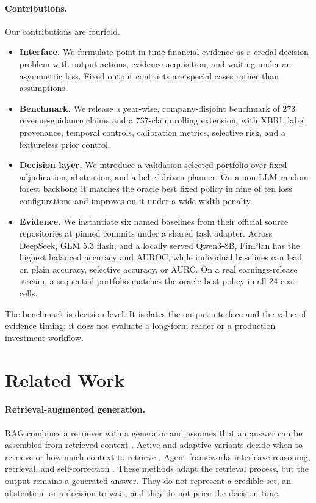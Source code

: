 \documentclass[11pt]{article}
\newcommand{\method}{FinPlan}
\begin{document}
\paragraph{Contributions.}
Our contributions are fourfold.
\begin{itemize}[leftmargin=*,itemsep=1pt,topsep=2pt]
\item \textbf{Interface.} We formulate point-in-time financial evidence as a credal decision problem with output actions, evidence acquisition, and waiting under an asymmetric loss. Fixed output contracts are special cases rather than assumptions.
\item \textbf{Benchmark.} We release a year-wise, company-disjoint benchmark of 273 revenue-guidance claims and a 737-claim rolling extension, with XBRL label provenance, temporal controls, calibration metrics, selective risk, and a featureless prior control.
\item \textbf{Decision layer.} We introduce a validation-selected portfolio over fixed adjudication, abstention, and a belief-driven planner. On a non-LLM random-forest backbone it matches the oracle best fixed policy in nine of ten loss configurations and improves on it under a wide-width penalty.
\item \textbf{Evidence.} We instantiate six named baselines from their official source repositories at pinned commits under a shared task adapter. Across DeepSeek, GLM 5.3 flash, and a locally served Qwen3-8B, \method{} has the highest balanced accuracy and AUROC, while individual baselines can lead on plain accuracy, selective accuracy, or AURC. On a real earnings-release stream, a sequential portfolio matches the oracle best policy in all 24 cost cells.
\end{itemize}

The benchmark is decision-level. It isolates the output interface and the value of evidence timing; it does not evaluate a long-form reader or a production investment workflow.

\section{Related Work}

\paragraph{Retrieval-augmented generation.}
RAG combines a retriever with a generator and assumes that an answer can be assembled from retrieved context \citep{lewis2020rag}. Active and adaptive variants decide when to retrieve or how much context to retrieve \citep{jiang2023flare,jeong2024adaptiverag}. Agent frameworks interleave reasoning, retrieval, and self-correction \citep{yao2023react,shinn2023reflexion}. These methods adapt the retrieval process, but the output remains a generated answer. They do not represent a credible set, an abstention, or a decision to wait, and they do not price the decision time.
\end{document}
